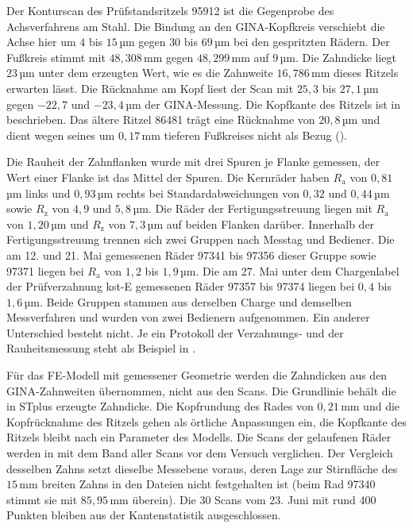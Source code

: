 Der Konturscan des Prüfstandsritzels 95912 ist die Gegenprobe des Achsverfahrens am Stahl. Die Bindung an den GINA-Kopfkreis verschiebt die Achse hier um $4$ bis $15$\,µm gegen $30$ bis $69$\,µm bei den gespritzten Rädern. Der Fußkreis stimmt mit $48{,}308$\,mm gegen $48{,}299$\,mm auf $9$\,µm. Die Zahndicke liegt $23$\,µm unter dem erzeugten Wert, wie es die Zahnweite $16{,}786$\,mm dieses Ritzels erwarten lässt. Die Rücknahme am Kopf liest der Scan mit $25{,}3$ bis $27{,}1$\,µm gegen $-22{,}7$ und $-23{,}4$\,µm der GINA-Messung. Die Kopfkante des Ritzels ist in  beschrieben. Das ältere Ritzel 86481 trägt eine Rücknahme von $20{,}8$\,µm und dient wegen seines um $0{,}17$\,mm tieferen Fußkreises nicht als Bezug ().


Die Rauheit der Zahnflanken wurde mit drei Spuren je Flanke gemessen, der Wert einer Flanke ist das Mittel der Spuren. Die Kernräder haben $R_{\mathrm{a}}$ von $0{,}81$\,µm links und $0{,}93$\,µm rechts bei Standardabweichungen von $0{,}32$ und $0{,}44$\,µm sowie $R_{\mathrm{z}}$ von $4{,}9$ und $5{,}8$\,µm. Die Räder der Fertigungsstreuung liegen mit $R_{\mathrm{a}}$ von $1{,}20$\,µm und $R_{\mathrm{z}}$ von $7{,}3$\,µm auf beiden Flanken darüber. Innerhalb der Fertigungsstreuung trennen sich zwei Gruppen nach Messtag und Bediener. Die am 12. und 21. Mai gemessenen Räder 97341 bis 97356 dieser Gruppe sowie 97371 liegen bei $R_{\mathrm{a}}$ von $1{,}2$ bis $1{,}9$\,µm. Die am 27. Mai unter dem Chargenlabel der Prüfverzahnung kst-E gemessenen Räder 97357 bis 97374 liegen bei $0{,}4$ bis $1{,}6$\,µm. Beide Gruppen stammen aus derselben Charge und demselben Messverfahren und wurden von zwei Bedienern aufgenommen. Ein anderer Unterschied besteht nicht. Je ein Protokoll der Verzahnungs- und der Rauheitsmessung steht als Beispiel in .

Für das FE-Modell mit gemessener Geometrie werden die Zahndicken aus den GINA-Zahnweiten übernommen, nicht aus den Scans. Die Grundlinie behält die in STplus erzeugte Zahndicke. Die Kopfrundung des Rades von $0{,}21$\,mm und die Kopfrücknahme des Ritzels gehen als örtliche Anpassungen ein, die Kopfkante des Ritzels bleibt nach  ein Parameter des Modells. Die Scans der gelaufenen Räder werden in  mit dem Band aller Scans vor dem Versuch verglichen. Der Vergleich desselben Zahns setzt dieselbe Messebene voraus, deren Lage zur Stirnfläche des $15$\,mm breiten Zahns in den Dateien nicht festgehalten ist (beim Rad 97340 stimmt sie mit $85{,}95$\,mm überein). Die 30 Scans vom 23. Juni mit rund 400 Punkten bleiben aus der Kantenstatistik ausgeschlossen.

